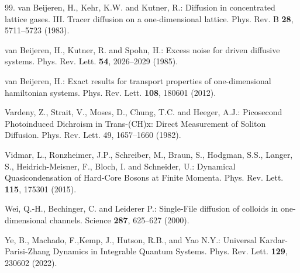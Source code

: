 \documentclass[12pt]{article}
\begin{document}
\begin{thebibliography}{99.}
van Beijeren, H., Kehr, K.W. and Kutner, R.: 
Diffusion in concentrated lattice gases. III. Tracer diffusion on a
one-dimensional lattice.
Phys. Rev. B \textbf{28},  5711--5723 (1983).

van Beijeren, H., Kutner, R. and Spohn, H.: 
Excess noise for driven diffusive systems.
Phys. Rev. Lett. \textbf{54}, 2026--2029 (1985).

van Beijeren, H.:
Exact results for transport properties of one-dimensional hamiltonian systems.
Phys. Rev. Lett. \textbf{108}, 180601 (2012).

Vardeny, Z., Strait, V., Moses, D., Chung, T.C. and Heeger, A.J.:
Picosecond Photoinduced Dichroism in Trans-(CH)x: Direct Measurement of Soliton Diffusion.
Phys. Rev. Lett. 49, 1657--1660 (1982).

Vidmar, L., Ronzheimer, J.P., Schreiber, M., Braun, S., Hodgman,  S.S., Langer, S.,
Heidrich-Meisner, F., Bloch, I. and Schneider, U.:
Dynamical Quasicondensation of Hard-Core Bosons at Finite Momenta.
Phys. Rev. Lett. \textbf{115}, 175301 (2015).

Wei, Q.-H., Bechinger, C. and Leiderer P.: 
Single-File diffusion of colloids in one-dimensional channels.
Science \textbf{287}, 625--627 (2000).

Ye, B., Machado, F.,Kemp, J., Hutson, R.B., and Yao N.Y.:
Universal Kardar-Parisi-Zhang Dynamics in Integrable Quantum Systems.
Phys. Rev. Lett. \textbf{129}, 230602 (2022).


\end{thebibliography}
\end{document}
